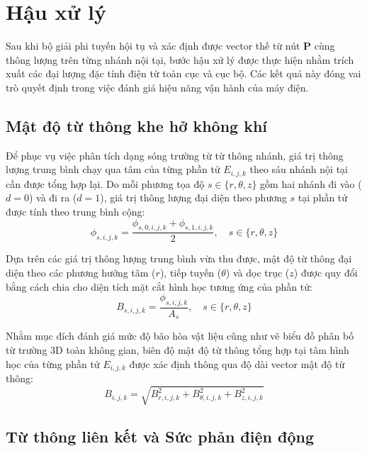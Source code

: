 \section{Hậu xử lý}

Sau khi bộ giải phi tuyến hội tụ và xác định được vector thế từ nút $\mathbf{P}$ cùng thông lượng trên từng nhánh nội tại, bước hậu xử lý được thực hiện nhằm trích xuất các đại lượng đặc tính điện từ toàn cục và cục bộ. Các kết quả này đóng vai trò quyết định trong việc đánh giá hiệu năng vận hành của máy điện.

\subsection{Mật độ từ thông khe hở không khí}

Để phục vụ việc phân tích dạng sóng trường từ từ thông nhánh, giá trị thông lượng trung bình chạy qua tâm của từng phần tử $E_{i,j,k}$ theo sáu nhánh nội tại cần được tổng hợp lại. Do mỗi phương tọa độ $s \in \{r, \theta, z\}$ gồm hai nhánh đi vào ($d=0$) và đi ra ($d=1$), giá trị thông lượng đại diện theo phương $s$ tại phần tử được tính theo trung bình cộng:
\begin{equation}
    \phi_{s,i,j,k} = \frac{\phi_{s,0,i,j,k} + \phi_{s,1,i,j,k}}{2}, \quad s \in \{r, \theta, z\}
\end{equation}

Dựa trên các giá trị thông lượng trung bình vừa thu được, mật độ từ thông đại diện theo các phương hướng tâm ($r$), tiếp tuyến ($\theta$) và dọc trục ($z$) được quy đổi bằng cách chia cho diện tích mặt cắt hình học tương ứng của phần tử:
\begin{equation}
    B_{s,i,j,k} = \frac{\phi_{s,i,j,k}}{A_s}, \quad s \in \{r, \theta, z\}
\end{equation}

Nhằm mục đích đánh giá mức độ bão hòa vật liệu cũng như vẽ biểu đồ phân bố từ trường 3D toàn không gian, biên độ mật độ từ thông tổng hợp tại tâm hình học của từng phần tử $E_{i,j,k}$ được xác định thông qua độ dài vector mật độ từ thông:
\begin{equation}
    B_{i,j,k} = \sqrt{B_{r,i,j,k}^2 + B_{\theta,i,j,k}^2 + B_{z,i,j,k}^2}
\end{equation}

\subsection{Từ thông liên kết và Sức phản điện động}

